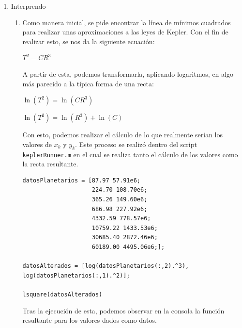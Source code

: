 \documentclass[english,notitlepage,letterpaper, 10pt]{article} %
\begin{document}
\begin{enumerate}
\begin{enumerate}
    \end{enumerate}

    \item Interprendo
    
    \begin{enumerate}
      \item Como manera inicial, se pide encontrar la línea de mínimos cuadrados para realizar unas aproximaciones a las leyes de Kepler. Con el fin de realizar esto, se nos da la siguiente ecuación:

      \begin{center}
        \begin{math}
          T^2 = C R^3
        \end{math}
      \end{center}

      A partir de esta, podemos transformarla, aplicando logaritmos, en algo más parecido a la típica forma de una recta:

      \begin{center}
        \begin{math}
          \ln (T^2) = \ln (CR^3)
        \end{math}

        \begin{math}
          \ln(T^2) = \ln(R^3) + \ln(C) 
        \end{math}
      \end{center}

      Con esto, podemos realizar el cálculo de lo que realmente serían los valores de $x_k$ y $y_k$. Este proceso se realizó dentro del script \texttt{keplerRunner.m} en el cual se realiza tanto el cálculo de los valores como la recta resultante.

      \begin{lstlisting}
datosPlanetarios = [87.97 57.91e6;
                    224.70 108.70e6;
                    365.26 149.60e6;
                    686.98 227.92e6;
                    4332.59 778.57e6;
                    10759.22 1433.53e6;
                    30685.40 2872.46e6;
                    60189.00 4495.06e6;];

datosAlterados = [log(datosPlanetarios(:,2).^3), log(datosPlanetarios(:,1).^2)];

lsquare(datosAlterados)
      \end{lstlisting}

      Tras la ejecución de esta, podemos observar en la consola la función resultante para los valores dados como datos.


\end{enumerate}
\end{enumerate}
\end{document}
